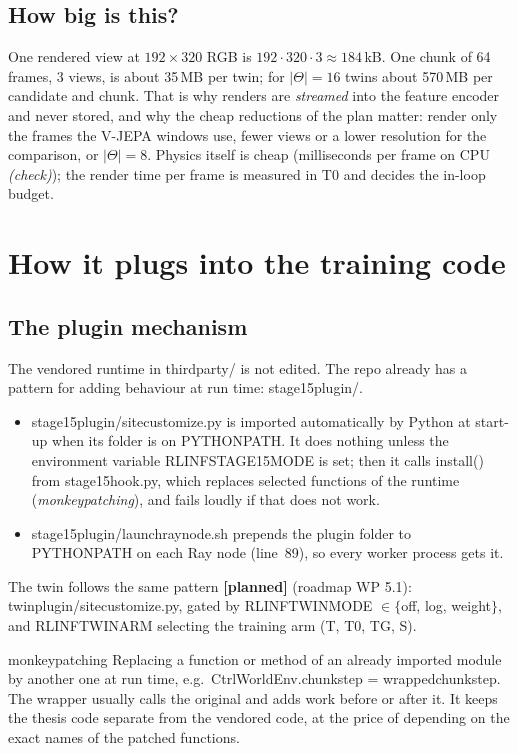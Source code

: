 \documentclass[11pt,a4paper]{article}
\newcommand{\planned}{\textcolor{plangray}{\textbf{[planned]}}}
\newcommand{\chk}{\textit{(check)}}
\newcommand{\code}[1]{{\small\ttfamily\begingroup\def\_{\textunderscore\allowbreak}\def\/{/\allowbreak}#1\endgroup}}
\begin{document}
\subsection{How big is this?}\label{sec:size}
One rendered view at $192\times320$ RGB is $192\cdot320\cdot3\approx184$\,kB. One chunk of 64 frames, 3 views, is about 35\,MB per twin; for $|\Theta|=16$ twins about 570\,MB per candidate and chunk. That is why renders are \emph{streamed} into the feature encoder and never stored, and why the cheap reductions of the plan matter: render only the frames the V-JEPA windows use, fewer views or a lower resolution for the comparison, or $|\Theta|=8$. Physics itself is cheap (milliseconds per frame on CPU \chk); the render time per frame is measured in T0 and decides the in-loop budget.

\section{How it plugs into the training code}\label{sec:integration}
\subsection{The plugin mechanism}
The vendored runtime in \code{third\_party/} is not edited. The repo already has a pattern for adding behaviour at run time: \code{stage15\_plugin/}.
\begin{itemize}
\item \code{stage15\_plugin\/sitecustomize.py} is imported automatically by Python at start-up when its folder is on \code{PYTHONPATH}. It does nothing unless the environment variable \code{RLINF\_STAGE15\_MODE} is set; then it calls \code{install()} from \code{stage15\_hook.py}, which replaces selected functions of the runtime (\emph{monkeypatching}), and fails loudly if that does not work.
\item \code{stage15\_plugin\/launch\_ray\_node.sh} prepends the plugin folder to \code{PYTHONPATH} on each Ray node (line~89), so every worker process gets it.
\end{itemize}
The twin follows the same pattern \planned{} (roadmap WP 5.1): \code{twin\_plugin\/sitecustomize.py}, gated by \code{RLINF\_TWIN\_MODE} $\in\{$\code{off}, \code{log}, \code{weight}$\}$, and \code{RLINF\_TWIN\_ARM} selecting the training arm (T, T0, TG, S).

\begin{newc}{monkeypatching}
Replacing a function or method of an already imported module by another one at run time, e.g.\ \code{CtrlWorldEnv.chunk\_step = wrapped\_chunk\_step}. The wrapper usually calls the original and adds work before or after it. It keeps the thesis code separate from the vendored code, at the price of depending on the exact names of the patched functions.
\end{newc}
\end{document}
